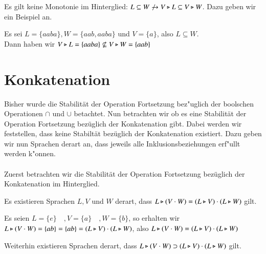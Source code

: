 Es gilt keine Monotonie im Hinterglied: $L\subseteq W \not\to V\triangleright L \subseteq V \triangleright W$. Dazu geben wir ein Beispiel an.

\vspace{2ex}

\begin{beispiel}
Es sei $L=\{aaba\},W=\{aab,aaba\}$ und $V=\{a\}$, also $L\subseteq W$.\\
Dann haben wir $V\triangleright L = \{aaba\} \not\subseteq V\triangleright W =\{aab\}$
\end{beispiel}



\section{Konkatenation}
Bisher wurde die Stabilität der Operation Fortsetzung bez"uglich der boolschen Operationen $\cap$ und $\cup$ betachtet.
Nun betrachten wir ob es eine Stabilität der Operation Fortsetzung bezüglich der Konkatenation gibt.
Dabei werden wir feststellen, dass keine Stabiltät bezüglich der Konkatenation existiert. Dazu geben wir nun Sprachen derart an, dass jeweils alle Inklusionsbeziehungen erf"ullt werden k"onnen.\\\\
Zuerst betrachten wir die Stabilität der Operation Fortsetzung bezüglich der Konkatenation im Hinterglied.

Es existieren Sprachen $L,V$ und $W$ derart, dass $L\triangleright (V\cdot W) = (L\triangleright V) \cdot (L\triangleright W)$ gilt.

\vspace{2ex}

\begin{beispiel}
Es seien  $L=\{e\}\quad ,V=\{a\}\quad ,W=\{b\} $, so erhalten wir \\
$L\triangleright (V\cdot W) = \{ ab\} =  \{ab\} = (L\triangleright V) \cdot (L\triangleright W)$, also $L\triangleright (V\cdot W) = (L\triangleright V) \cdot (L\triangleright W)$
\end{beispiel}
Weiterhin existieren Sprachen derart, dass $L\triangleright (V\cdot W) \supset (L\triangleright V) \cdot (L\triangleright W)$ gilt.

